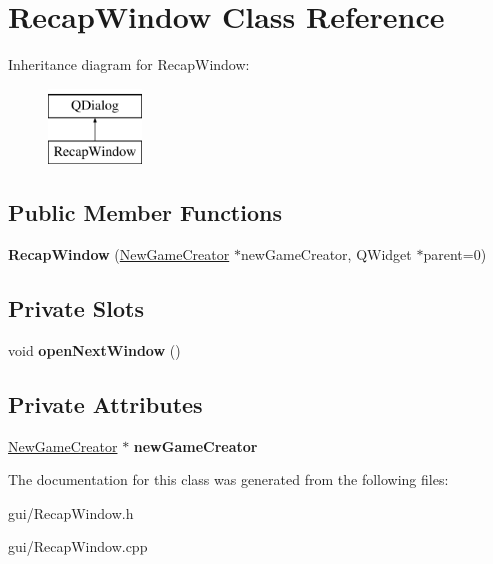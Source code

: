 \hypertarget{classRecapWindow}{}\section{Recap\+Window Class Reference}
\label{classRecapWindow}
Inheritance diagram for Recap\+Window\+:\begin{figure}[H]
\begin{center}
\leavevmode
\includegraphics[height=2.000000cm]{classRecapWindow}
\end{center}
\end{figure}
\subsection*{Public Member Functions}
\begin{DoxyCompactItemize}
\item 
\mbox{\label{classRecapWindow_a0f89f24533eeeb2c5d91376dc14c5602}} 
{\bfseries Recap\+Window} (\hyperlink{classNewGameCreator}{New\+Game\+Creator} $\ast$new\+Game\+Creator, Q\+Widget $\ast$parent=0)
\end{DoxyCompactItemize}
\subsection*{Private Slots}
\begin{DoxyCompactItemize}
\item 
\mbox{\label{classRecapWindow_ae285e915c54b2c7c7315cc9e1d671397}} 
void {\bfseries open\+Next\+Window} ()
\end{DoxyCompactItemize}
\subsection*{Private Attributes}
\begin{DoxyCompactItemize}
\item 
\mbox{\label{classRecapWindow_a46bcf1b62d62dd9cfa6e20a78f7f60f0}} 
\hyperlink{classNewGameCreator}{New\+Game\+Creator} $\ast$ {\bfseries new\+Game\+Creator}
\end{DoxyCompactItemize}


The documentation for this class was generated from the following files\+:\begin{DoxyCompactItemize}
\item 
gui/Recap\+Window.\+h\item 
gui/Recap\+Window.\+cpp\end{DoxyCompactItemize}
